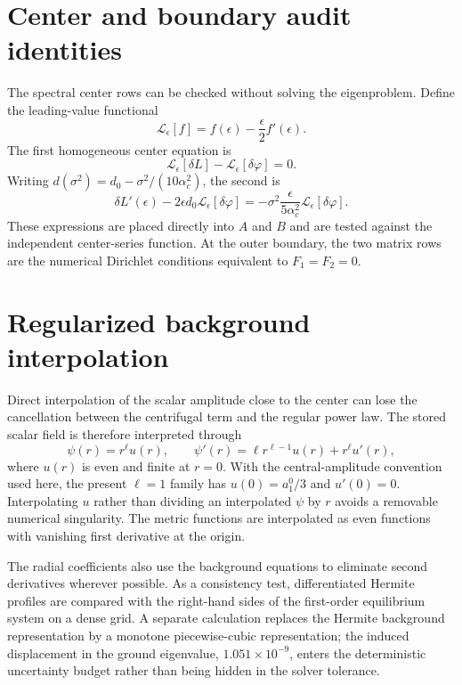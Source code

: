 \documentclass[aps,prd,preprint,onecolumn,nofootinbib,superscriptaddress,showkeys]{revtex4-2}
\newcommand{\sigmatwo}{\sigma^{2}}
\begin{document}
\appendix

\section{Center and boundary audit identities}

The spectral center rows can be checked without solving the eigenproblem. Define the leading-value functional
\begin{equation}
\mathcal{L}_{\epsilon}[f]=f(\epsilon)-\frac{\epsilon}{2}f'(\epsilon).
\end{equation}
The first homogeneous center equation is
\begin{equation}
\mathcal{L}_{\epsilon}[\delta L]-\mathcal{L}_{\epsilon}[\delta\varphi]=0.
\end{equation}
Writing $d(\sigmatwo)=d_{0}-\sigmatwo/(10\alpha_{c}^{2})$, the second is
\begin{equation}
\delta L'(\epsilon)-2\epsilon d_{0}\mathcal{L}_{\epsilon}[\delta\varphi]
=-\sigmatwo\frac{\epsilon}{5\alpha_{c}^{2}}\mathcal{L}_{\epsilon}[\delta\varphi].
\end{equation}
These expressions are placed directly into $A$ and $B$ and are tested against the independent center-series function. At the outer boundary, the two matrix rows are the numerical Dirichlet conditions equivalent to $F_{1}=F_{2}=0$.

\section{Regularized background interpolation}

Direct interpolation of the scalar amplitude close to the center can lose the cancellation between the centrifugal term and the regular power law. The stored scalar field is therefore interpreted through
\begin{equation}
 \psi(r)=r^{\ell}u(r),
 \qquad
 \psi'(r)=\ell r^{\ell-1}u(r)+r^{\ell}u'(r),
\end{equation}
where $u(r)$ is even and finite at $r=0$. With the central-amplitude convention used here, the present $\ell=1$ family has $u(0)=a_{1}^{0}/3$ and $u'(0)=0$. Interpolating $u$ rather than dividing an interpolated $\psi$ by $r$ avoids a removable numerical singularity. The metric functions are interpolated as even functions with vanishing first derivative at the origin.

The radial coefficients also use the background equations to eliminate second derivatives wherever possible. As a consistency test, differentiated Hermite profiles are compared with the right-hand sides of the first-order equilibrium system on a dense grid. A separate calculation replaces the Hermite background representation by a monotone piecewise-cubic representation; the induced displacement in the ground eigenvalue, $1.051\times10^{-9}$, enters the deterministic uncertainty budget rather than being hidden in the solver tolerance.
\end{document}
